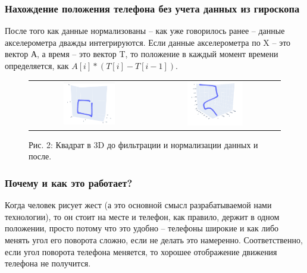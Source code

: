 \subsubsection{Нахождение положения телефона без учета данных из гироскопа}

После того как данные нормализованы – как уже говорилось ранее – данные акселерометра дважды интегрируются. Если данные акселерометра по X – это вектор А, а время – это вектор T, то положение в каждый момент времени определяется, как $A[i] * (T[i] - T[i-1])$.

\begin{figure}[H]
    \begin{center}
        \begin{tabular}{cc}
            \includegraphics[width=0.45\textwidth]{sam_images/3d_graph_1.png} & 
            \includegraphics[width=0.45\textwidth]{sam_images/3d_graph_2.png} \\
        \end{tabular}
    \end{center}
    \caption{Рис. 2: Квадрат в 3D до фильтрации и нормализации данных и после.}
\end{figure}

\subsubsection{Почему и как это работает?}

Когда человек рисует жест (а это основной смысл разрабатываемой нами технологии), то он стоит на месте и телефон, как правило, держит в одном положении, просто потому что это удобно – телефоны широкие и как либо менять угол его поворота сложно, если не делать это намеренно. Соответственно, если угол поворота телефона меняется, то хорошее отображение движения телефона не получится.
\newpage

